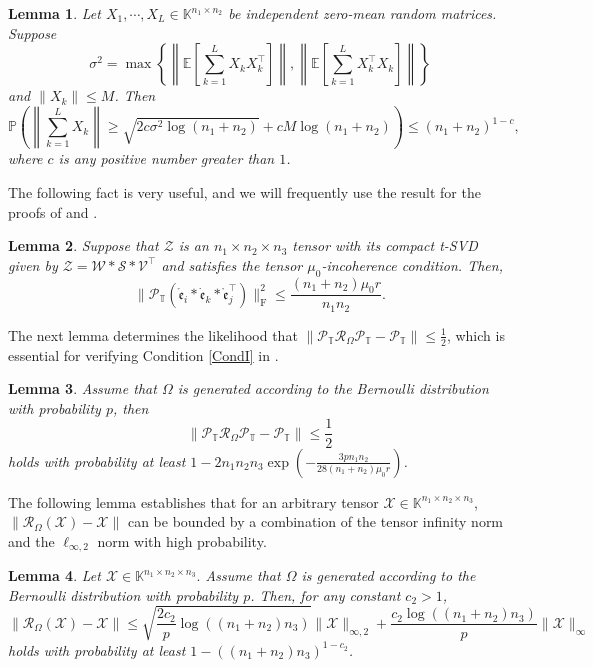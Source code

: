 \documentclass[twoside,12pt]{article}
\newtheorem{lemma}{Lemma}
\def\fro{{\mathrm{F}}}
\def\fro{{\mathrm{F}}}
\def\dme{{\dot{\mathfrak{e}}}}
\def\mrme{{\mathring{\mathfrak{e}}}}
\begin{document}
\begin{lemma}\label{BernsteinInequality2} \rm
 Let $X_1,\cdots,X_{L}\in\mathbb{K}^{n_1\times n_2}$ be independent zero-mean random matrices. Suppose $$\sigma^2=\max\left\{\left\|\mathbb{E}[\sum\limits_{k=1}^{L}X_{k}X_{k}^{\top}]\right\|,\left\|\mathbb{E}[\sum\limits_{k=1}^{L}X_{k}^{\top}X_{k}]\right\|\right\}$$ and $\left\|X_{k}\right\|\leq M$. Then  
 $$
  \mathbb{P}\left(\left\|\sum\limits_{k=1}^{L} X_k\right\| \geq  \sqrt{2c \sigma^2 \log \left(n_1+n_2\right)}+c M\log \left(n_1+n_2\right)\right)\leq (n_1+n_2)^{1-c}
 ,$$
 where $c$ is any positive number greater than $1$. 
\end{lemma}
  The following fact is very useful, and we will frequently use  the result for the proofs of  and   .
\begin{lemma}\label{ptbound} Suppose that $\mathcal{Z}$ is an $n_1 \times n_2 \times n_3$ tensor with its compact t-SVD given by $\mathcal{Z}=\mathcal{W} * \mathcal{S} * \mathcal{V}^{\top}$ and satisfies   the tensor $\mu_0$-incoherence condition. Then,
$$\|\mathcal{P}_{\mathbb{T}}(\mrme_i * \dme_k * \mrme_j^{\top})\|_{\fro}^2 \leq \frac{(n_1+n_2)\mu_{0}r}{n_{1}n_{2}}.$$
\end{lemma}
 The next lemma determines the likelihood that   $\|\mathcal{P}_{\mathbb{T}}\mathcal{R}_{\Omega}\mathcal{P}_{\mathbb{T}}-\mathcal{P}_{\mathbb{T}}\|\leq \frac{1}{2}$, which is essential for  verifying Condition \ref{CondI} in .
\begin{lemma}  \rm
 Assume that $\Omega$ is generated according to the Bernoulli distribution with probability $p$, then 
 $$\label{condtion1}
\left\|\mathcal{P}_{\mathbb{T}}\mathcal{R}_{\Omega}\mathcal{P}_{\mathbb{T}}-\mathcal{P}_{\mathbb{T}}\right\|\leq \frac{1}{2}
 $$ holds with probability at least $1-2n_1n_2n_3  \exp\left(-\frac{3pn_1n_2}{28(n_1+n_2)\mu_0 r}\right)$.
\end{lemma}

The following lemma establishes that for an arbitrary tensor $\mathcal{X} \in \mathbb{K}^{n_1 \times n_2 \times n_3}$,  $\|\mathcal{R}_{\Omega}(\mathcal{X}) - \mathcal{X}\|$ can be bounded by a combination of the tensor infinity norm and the $\ell_{\infty,2}$ norm with high probability.
\begin{lemma}  \label{conditionII1}\rm
Let $\mathcal{X}\in \mathbb{K}^{n_1\times n_2 \times n_3}.$  Assume that $\Omega$ is generated according to the Bernoulli distribution with probability $p$. Then, for any constant $c_2>1$,  
\begin{equation}\left\|\mathcal{R}_{\Omega}(\mathcal{X}) - \mathcal{X}\right\| \leq \sqrt{\frac{2c_2}{p}\log((n_1+n_2)n_3)}\|\mathcal{X}\|_{\infty,2}+\frac{c_2\log((n_1+n_2)n_3)}{p}\|\mathcal{X}\|_{\infty}
 \end{equation}
holds with probability at least $1-((n_1+n_2)n_3)^{1-c_2}$.
\end{lemma}
 
\end{document}
